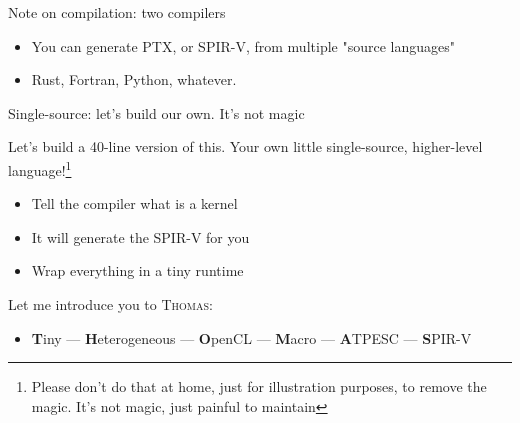 \begin{frame}{Note on compilation: two compilers}
\begin{center}
\end{center}
\begin{itemize}
    \item You can generate PTX, or SPIR-V, from multiple "source languages"
    \item Rust, Fortran, Python, whatever.
\end{itemize}
\end{frame}

\begin{frame}[fragile]{Single-source: let's build our own. It's not magic}

Let's build a 40-line version of this. Your own little single-source, higher-level language!\footnote{Please don't do that at home, just for illustration purposes, to remove the magic. It's not magic, just painful to maintain}

\begin{itemize}
    \item Tell the compiler what is a kernel
    \item It will generate the SPIR-V for you
    \item Wrap everything in a tiny runtime
\end{itemize}
Let me introduce you to \textsc{Thomas}:
\begin{itemize}
    \item \textbf{T}iny --- \textbf{H}eterogeneous --- \textbf{O}penCL ---
          \textbf{M}acro --- \textbf{A}TPESC --- \textbf{S}PIR-V
\end{itemize}
\end{frame}


